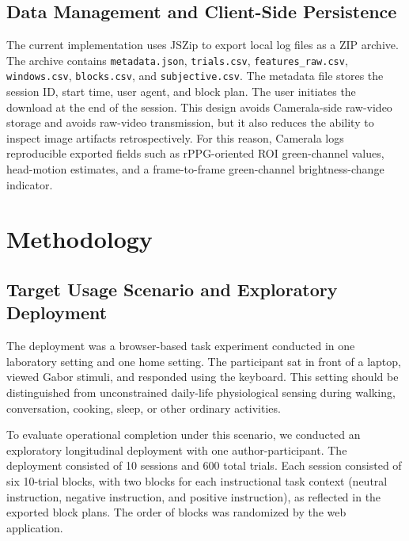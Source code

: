 \documentclass[dvipdfmx]{ehis}
\begin{document}
\subsection{Data Management and Client-Side Persistence}
The current implementation uses JSZip to export local log files as a ZIP archive.
The archive contains \texttt{metadata.json}, \texttt{trials.csv}, \texttt{features\_raw.csv}, \texttt{windows.csv}, \texttt{blocks.csv}, and \texttt{subjective.csv}.
The metadata file stores the session ID, start time, user agent, and block plan.
The user initiates the download at the end of the session.
This design avoids Camerala-side raw-video storage and avoids raw-video transmission, but it also reduces the ability to inspect image artifacts retrospectively.
For this reason, Camerala logs reproducible exported fields such as rPPG-oriented ROI green-channel values, head-motion estimates, and a frame-to-frame green-channel brightness-change indicator.

\section{Methodology}

\subsection{Target Usage Scenario and Exploratory Deployment}
The deployment was a browser-based task experiment conducted in one laboratory setting and one home setting.
The participant sat in front of a laptop, viewed Gabor stimuli, and responded using the keyboard.
This setting should be distinguished from unconstrained daily-life physiological sensing during walking, conversation, cooking, sleep, or other ordinary activities.

To evaluate operational completion under this scenario, we conducted an exploratory longitudinal deployment with one author-participant.
The deployment consisted of 10 sessions and 600 total trials.
Each session consisted of six 10-trial blocks, with two blocks for each instructional task context (neutral instruction, negative instruction, and positive instruction), as reflected in the exported block plans.
The order of blocks was randomized by the web application.
\end{document}
